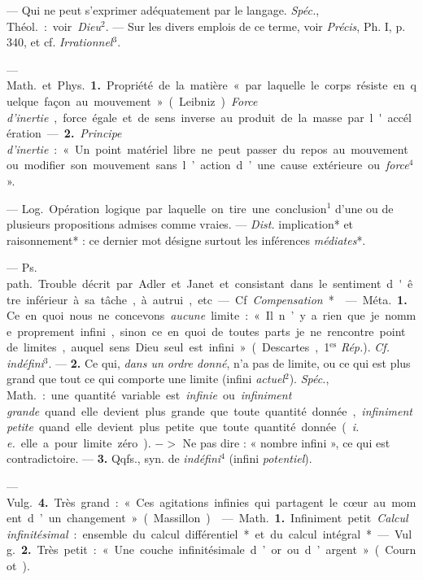 \begin{itemize}[leftmargin=1cm, label=, itemsep=1pt]
 — Qui ne peut s'exprimer adéquatement par le langage.
{\it Spéc.}, \si{Théol.} : voir {\it Dieu}$^2$. — Sur les divers emplois de
ce terme, voir {\it Précis}, Ph. I, p. 340, et cf. {\it Irrationnel}$^3$.

 — \si{Math.} et \si{Phys.} {\bf 1.} Propriété de la matière
« par laquelle le corps résiste en quelque façon au mouvement » (Leibniz).
{\it Force d'inertie}, force égale et de sens inverse au produit de la masse
par l'accélération. — {\bf 2.} {\it Principe d'inertie} : « Un point matériel
libre ne peut passer du repos au mouvement ou modifier son mouvement sans
l’action d’une cause extérieure ou {\it force}$^4$ ».

 — \si{Log.} Opération logique par laquelle on tire une
conclusion$^1$ d’une ou de plusieurs propositions admises comme vraies. —
{\it Dist.} implication* et raisonnement* : ce dernier mot désigne surtout
les inférences {\it médiates}*.

 — \si{Ps. path.} Trouble décrit
par Adler et Janet et consistant dans le sentiment d'être inférieur à sa
tâche, à autrui, etc — Cf {\it Compensation}*.

 — \si{Méta.} {\bf 1.} Ce en quoi nous ne concevons {\it aucune}
limite : « Il n’y a rien que je nomme proprement infini, sinon ce en quoi de
toutes parts je ne rencontre point de limites, auquel sens Dieu seul est
infini » (Descartes, 1$^\text{es}$ {\it Rép.}). {\it Cf.} {\it indéfini}$^3$.
— {\bf 2.} Ce qui, {\it dans un ordre donné}, n'a pas de limite, ou ce qui
est plus grand que tout ce qui comporte une limite (infini {\it actuel}$^2$).
{\it Spéc.}, \si{Math.} : une quantité variable est {\it infinie} ou
{\it infiniment grande} quand elle devient plus grande que toute quantité
donnée, {\it infiniment petite} quand elle devient plus petite que toute
quantité donnée ({\it i. e.} elle a pour limite zéro). $->$ Ne pas dire :
« nombre infini », ce qui est contradictoire. — {\bf 3.} Qqfs., syn. de
{\it indéfini}$^4$ (infini {\it potentiel}).

— \si{Vulg.} {\bf 4.} Très grand : « Ces agitations infinies qui partagent le
cœur au moment d’un changement » (Massillon).

 — \si{Math.} {\bf 1.} Infiniment petit. {\it Calcul
infinitésimal} : ensemble du calcul différentiel* et du calcul intégral*.

— \si{Vulg.} {\bf 2.} Très petit : « Une couche infinitésimale d’or ou
d’argent » (Cournot).


\end{itemize}
